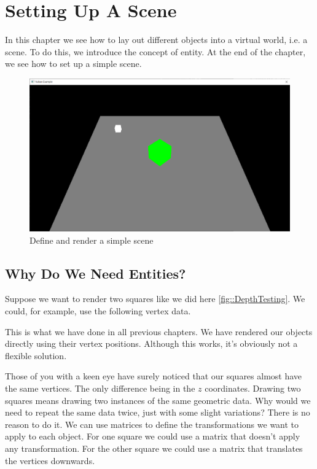 \chapter{Setting Up A Scene}

In this chapter we see how to lay out different objects into a virtual
world, i.e. a scene.
To do this, we introduce the concept of entity.
At the end of the chapter, we see how to set up a simple scene.

\begin{figure}[ht]
    \centering
    \includegraphics[scale=0.20]{images/ChScene/SimpleScene.png}
    \caption{Define and render a simple scene}
    \label{fig::SimpleScene}
\end{figure}

\section{Why Do We Need Entities?}

Suppose we want to render two squares like we did here \ref{fig::DepthTesting}.
We could, for example, use the following vertex data.

\begin{minipage}{\linewidth}{\noindent}
    
\end{minipage}

This is what we have done in all previous chapters.
We have rendered our objects directly using their vertex positions.
Although this works, it's obviously not a flexible solution.

Those of you with a keen eye have surely noticed
that our squares almost have the same vertices.
The only difference being in the $z$ coordinates.
Drawing two squares means drawing two instances of the same geometric data.
Why would we need to repeat the same data twice, just with some slight variations?
There is no reason to do it.
We can use matrices to define the transformations we want to apply to each object.
For one square we could use a matrix that doesn't apply any transformation.
For the other square we could use a matrix that translates the vertices downwards.


